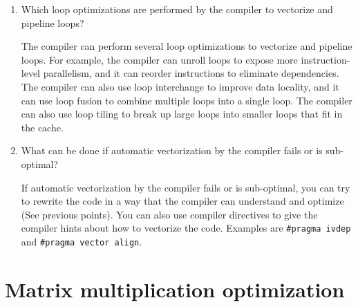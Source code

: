 \documentclass[unicode,11pt,a4paper,oneside,numbers=endperiod,openany]{scrartcl}
\begin{document}
\begin{enumerate}
    \item Which loop optimizations are performed by the compiler to vectorize and pipeline loops?

          The compiler can perform several loop optimizations to vectorize and pipeline loops. For example, the compiler can unroll loops to expose more instruction-level parallelism, and it can reorder instructions to eliminate dependencies. The compiler can also use loop interchange to improve data locality, and it can use loop fusion to combine multiple loops into a single loop. The compiler can also use loop tiling to break up large loops into smaller loops that fit in the cache.

    \item What can be done if automatic vectorization by the compiler fails or is sub-optimal?

          If automatic vectorization by the compiler fails or is sub-optimal, you can try to rewrite the code in a way that the compiler can understand and optimize (See previous points). You can also use compiler directives to give the compiler hints about how to vectorize the code. Examples are \texttt{\#pragma ivdep} and \texttt{\#pragma vector align}.

\end{enumerate}

\section{Matrix multiplication optimization}
\end{document}
